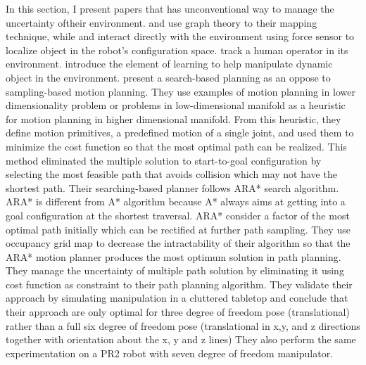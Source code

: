 In this section, I present papers that has unconventional way to manage the uncertainty oftheir environment. 
\textcite{Cohen2010} and \textcite{Meeussen2007} use graph theory to
their mapping technique, while \textcite{Petrovskaya2006} and 
\textcite{Koval2013} interact
directly with the environment using force sensor to localize object in the robot’s configuration
space. \textcite{Corrales2008} track a human operator in its environment. \textcite{Ruhr2012}
introduce the element of learning to help manipulate dynamic object in the environment.
\textcite{Cohen2010} present a search-based planning as an oppose to sampling-based
motion planning. They use examples of motion planning in lower dimensionality problem or
problems in low-dimensional manifold as a heuristic for motion planning in higher dimensional
manifold. From this heuristic, they define motion primitives, a predefined motion of a single joint,
and used them to minimize the cost function so that the most optimal path can be realized. This
method eliminated the multiple solution to start-to-goal configuration by selecting the most
feasible path that avoids collision which may not have the shortest path. Their searching-based
planner follows \acrfull{ARA*} search algorithm. ARA* is different from A*
algorithm because A* always aims at getting into a goal configuration at the shortest traversal.
ARA* consider a factor of the most optimal path initially which can be rectified at further path
sampling. They use occupancy grid map to decrease the intractability of their algorithm so that
the ARA* motion planner produces the most optimum solution in path planning. They manage
the uncertainty of multiple path solution by eliminating it using cost function as constraint to their
path planning algorithm. They validate their approach by simulating manipulation in a cluttered
tabletop and conclude that their approach are only optimal for three degree of freedom pose
(translational) rather than a full six degree of freedom pose (translational in x,y, and z directions
together with orientation about the x, y and z lines) They also perform the same experimentation
on a PR2 robot with seven degree of freedom manipulator.

